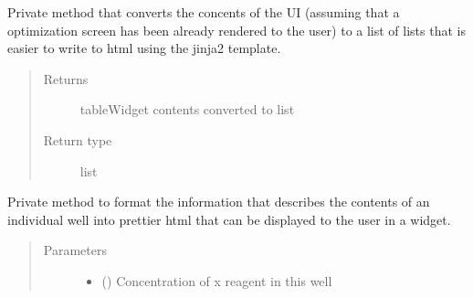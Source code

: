 \documentclass[letterpaper,10pt,english]{sphinxmanual}
\begin{document}
\begin{fulllineitems}

\begin{fulllineitems}
\label{\detokenize{polo.widgets:polo.widgets.optimize_widget.OptimizeWidget._make_plate_list}}
Private method that converts the concents of the 
 UI (assuming that a optimization screen has been
already rendered to the user) to a list of lists that
is easier to write to html using the jinja2 template.
\begin{quote}\begin{description}
\item[{Returns}] \leavevmode
tableWidget contents converted to list

\item[{Return type}] \leavevmode
list

\end{description}\end{quote}

\end{fulllineitems}


\begin{fulllineitems}
\label{\detokenize{polo.widgets:polo.widgets.optimize_widget.OptimizeWidget._make_well_html}}
Private method to format the information that describes the
contents of an individual well into prettier html that can be displayed
to the user in a  widget.
\begin{quote}\begin{description}
\item[{Parameters}] \leavevmode\begin{itemize}
\item {} 
 ({\hyperref[\detokenize{polo.crystallography:polo.crystallography.cocktail.UnitValue}]{}}) \textendash{} Concentration of x reagent in this well


\end{itemize}
\end{description}
\end{quote}
\end{fulllineitems}
\end{fulllineitems}
\end{document}

